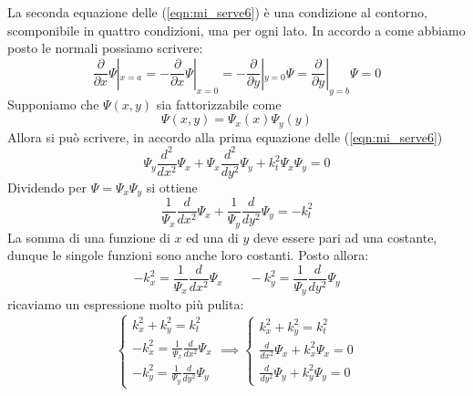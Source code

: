 \documentclass{book}
\begin{document}
    La seconda equazione delle (\ref{eqn:mi_serve6}) è una condizione al contorno, scomponibile in quattro condizioni, una per ogni lato.
    In accordo a come abbiamo posto le normali possiamo scrivere:
    \begin{equation}
        \frac{\partial}{\partial x} \Psi|_{x=a} = - \frac{\partial}{\partial x}\Psi|_{x=0} = -\frac{\partial}{\partial y}|_{y=0}\Psi = \frac{\partial}{\partial y}|_{y=b} \Psi = 0
    \end{equation}
    Supponiamo che $\Psi(x,y)$ sia fattorizzabile come
    \begin{equation}
        \Psi(x,y) = \Psi_{x}(x)\Psi_{y}(y)
    \end{equation} 
    Allora si può scrivere, in accordo alla prima equazione delle (\ref{eqn:mi_serve6})
    \begin{equation}
        \Psi_{y}\frac{d ^{2}}{d x^{2}}\Psi_{x} + \Psi_{x}\frac{d ^{2}}{d y^{2}}\Psi_{y} + k_{t} ^{2} \Psi_{x}\Psi_{y} = 0
    \end{equation}
    Dividendo per $\Psi=\Psi_{x}\Psi_{y}$ si ottiene
    \begin{equation}
        \frac{1}{\Psi_{x}}\frac{d}{dx^{2}}\Psi_{x}+\frac{1}{\Psi_{y}}\frac{d}{dy^{2}}\Psi_{y} = -k_{t} ^{2}
    \end{equation}
    La somma di una funzione di $x$ ed una di $y$ deve essere pari ad una costante, dunque le singole funzioni sono anche loro costanti. Posto allora:
    \begin{equation}
        -k_{x} ^{2} = \frac{1}{\Psi_{x}}\frac{d}{dx^{2}}\Psi_{x} \qquad -k_{y} ^{2} = \frac{1}{\Psi_{y}}\frac{d}{dy^{2}}\Psi_{y}
    \end{equation}
    ricaviamo un espressione molto più pulita:
    \begin{equation}
        \begin{cases}
            k_{x} ^{2}+k_{y} ^{2} = k_{t} ^{2} \\
            -k_{x} ^{2} = \frac{1}{\Psi_{x}}\frac{d}{dx^{2}}\Psi_{x} \\
            -k_{y} ^{2} = \frac{1}{\Psi_{y}}\frac{d}{dy^{2}}\Psi_{y}
        \end{cases}
        \implies
        \begin{cases}
            k_{x} ^{2}+k_{y} ^{2} = k_{t} ^{2} \\
            \frac{d}{dx^{2}}\Psi_{x}+k_{x}^{2}\Psi_{x} = 0 \\
            \frac{d}{dy^{2}}\Psi_{y}+k_{y}^{2}\Psi_{y} = 0
        \end{cases}
    \end{equation}
\end{document}
